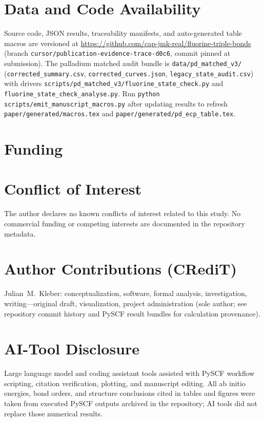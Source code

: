 \documentclass[10pt,twocolumn]{article}
\begin{document}
\section*{Data and Code Availability}
Source code, JSON results, traceability manifests, and auto-generated table macros are versioned at \url{https://github.com/cap-jmk-real/fluorine-triple-bonds} (branch \texttt{cursor/publication-evidence-trace-d0c6}, commit pinned at submission). The palladium matched audit bundle is \texttt{data/pd\_matched\_v3/} (\texttt{corrected\_summary.csv}, \texttt{corrected\_curves.json}, \texttt{legacy\_state\_audit.csv}) with drivers \texttt{scripts/pd\_matched\_v3/fluorine\_state\_check.py} and \texttt{fluorine\_state\_check\_analyse.py}. Run \texttt{python scripts/emit\_manuscript\_macros.py} after updating results to refresh \texttt{paper/generated/macros.tex} and \texttt{paper/generated/pd\_ecp\_table.tex}.

\section*{Funding}

\section*{Conflict of Interest}
The author declares no known conflicts of interest related to this study. No commercial funding or competing interests are documented in the repository metadata.

\section*{Author Contributions (CRediT)}
Julian~M.~Kleber: conceptualization, software, formal analysis, investigation, writing—original draft, visualization, project administration (sole author; see repository commit history and PySCF result bundles for calculation provenance).

\section*{AI-Tool Disclosure}
Large language model and coding assistant tools assisted with PySCF workflow scripting, citation verification, plotting, and manuscript editing. All ab initio energies, bond orders, and structure conclusions cited in tables and figures were taken from executed PySCF outputs archived in the repository; AI tools did not replace those numerical results.
\end{document}
